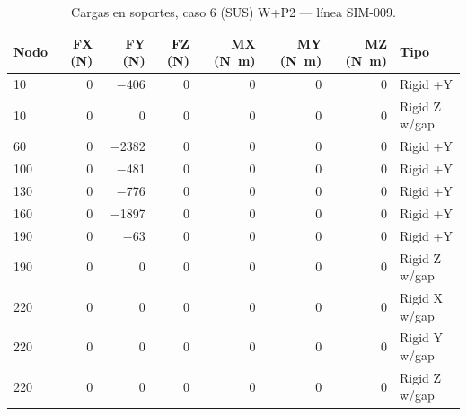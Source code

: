 \begin{table}[htbp]
  \centering
  \footnotesize
  \caption{Cargas en soportes, caso 6 (SUS) W+P2 — línea SIM-009.}
  \label{tab:restricciones-sus}
  \begin{tabular}{lrrrrrrl}
    \toprule
    Nodo & FX (\si{N}) & FY (\si{N}) & FZ (\si{N}) & MX (\si{N.m}) & MY (\si{N.m}) & MZ (\si{N.m}) & Tipo \\
    \midrule
    10 & \num{0} & \num{-406} & \num{0} & \num{0} & \num{0} & \num{0} & Rigid +Y \\
    10 & \num{0} & \num{0} & \num{0} & \num{0} & \num{0} & \num{0} & Rigid Z w/gap \\
    60 & \num{0} & \num{-2382} & \num{0} & \num{0} & \num{0} & \num{0} & Rigid +Y \\
    100 & \num{0} & \num{-481} & \num{0} & \num{0} & \num{0} & \num{0} & Rigid +Y \\
    130 & \num{0} & \num{-776} & \num{0} & \num{0} & \num{0} & \num{0} & Rigid +Y \\
    160 & \num{0} & \num{-1897} & \num{0} & \num{0} & \num{0} & \num{0} & Rigid +Y \\
    190 & \num{0} & \num{-63} & \num{0} & \num{0} & \num{0} & \num{0} & Rigid +Y \\
    190 & \num{0} & \num{0} & \num{0} & \num{0} & \num{0} & \num{0} & Rigid Z w/gap \\
    220 & \num{0} & \num{0} & \num{0} & \num{0} & \num{0} & \num{0} & Rigid X w/gap \\
    220 & \num{0} & \num{0} & \num{0} & \num{0} & \num{0} & \num{0} & Rigid Y w/gap \\
    220 & \num{0} & \num{0} & \num{0} & \num{0} & \num{0} & \num{0} & Rigid Z w/gap \\
    \bottomrule
  \end{tabular}
\end{table}
